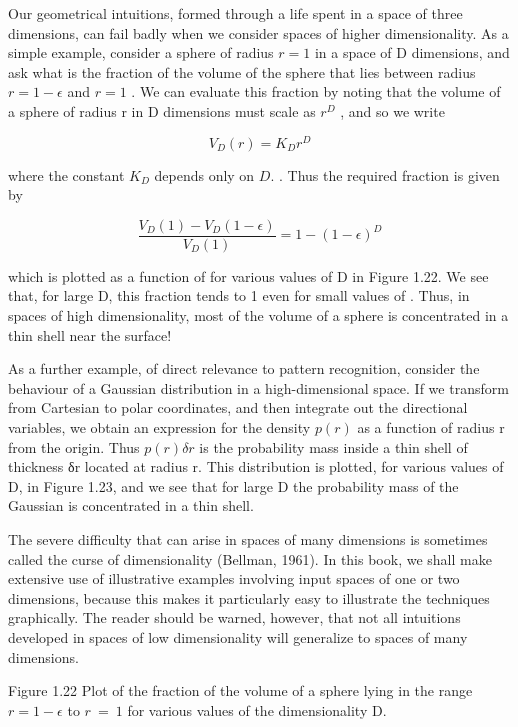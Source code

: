 \documentclass[
  10
]{article}
\begin{document}
Our geometrical intuitions, formed through a life spent in a space of
three dimensions, can fail badly when we consider spaces of higher
dimensionality. As a simple example, consider a sphere of radius
\(r = 1\) in a space of D dimensions, and ask what is the fraction of
the volume of the sphere that lies between radius \(r = 1 - \epsilon\)
and \(r = 1\) . We can evaluate this fraction by noting that the volume
of a sphere of radius r in D dimensions must scale as \(r ^ { D }\) ,
and so we write

\[
V _ {D} (r) = K _ {D} r ^ {D}\tag{1.75}
\]

where the constant \(K _ { D }\) depends only on \(D .\) . Thus the
required fraction is given by

\[
\frac {V _ {D} (1) - V _ {D} (1 - \epsilon)}{V _ {D} (1)} = 1 - (1 - \epsilon) ^ {D}\tag{1.76}
\]

which is plotted as a function of for various values of D in Figure
1.22. We see that, for large D, this fraction tends to 1 even for small
values of . Thus, in spaces of high dimensionality, most of the volume
of a sphere is concentrated in a thin shell near the surface!

As a further example, of direct relevance to pattern recognition,
consider the behaviour of a Gaussian distribution in a high-dimensional
space. If we transform from Cartesian to polar coordinates, and then
integrate out the directional variables, we obtain an expression for the
density \(p ( r )\) as a function of radius r from the origin. Thus
\(p ( r ) \delta r\) is the probability mass inside a thin shell of
thickness δr located at radius r. This distribution is plotted, for
various values of D, in Figure 1.23, and we see that for large D the
probability mass of the Gaussian is concentrated in a thin shell.

The severe difficulty that can arise in spaces of many dimensions is
sometimes called the curse of dimensionality (Bellman, 1961). In this
book, we shall make extensive use of illustrative examples involving
input spaces of one or two dimensions, because this makes it
particularly easy to illustrate the techniques graphically. The reader
should be warned, however, that not all intuitions developed in spaces
of low dimensionality will generalize to spaces of many dimensions.

Figure 1.22 Plot of the fraction of the volume of a sphere lying in the
range \(r = 1 - \epsilon\) to \(r \ = \ 1\) for various values of the
dimensionality D.
\end{document}
